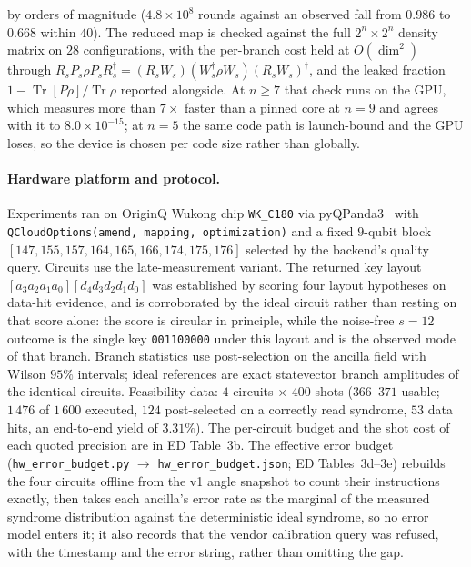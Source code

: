 \documentclass[aps,prxquantum,reprint,superscriptaddress]{revtex4-2}
\begin{document}
by orders of magnitude ($4.8\times10^{8}$ rounds against an observed fall from
$0.986$ to $0.668$ within $40$). The reduced map is checked against the full
$2^n\times2^n$ density matrix on $28$ configurations, with the per-branch cost
held at $O(\dim^2)$ through $R_sP_s\rho
P_sR_s^\dagger=(R_sW_s)(W_s^\dagger\rho W_s)(R_sW_s)^\dagger$, and the leaked
fraction $1-\operatorname{Tr}[P\rho]/\operatorname{Tr}\rho$ reported alongside.
At $n\ge7$ that check runs on the GPU, which measures more than $7\times$ faster
than a pinned core at $n=9$ and agrees with it to $8.0\times10^{-15}$; at $n=5$
the same code path is launch-bound and the GPU loses, so the device is chosen
per code size rather than globally.


\paragraph{Hardware platform and protocol.}
Experiments ran on OriginQ Wukong chip \texttt{WK\_C180} via
pyQPanda3~\cite{pyqpanda3,originq_cloud} with
\texttt{QCloudOptions(amend, mapping, optimization)} and a fixed
$9$-qubit block $[147,155,157,164,165,166,174,175,176]$ selected by the
backend's quality query. Circuits use the late-measurement variant. The
returned key layout $[a_3a_2a_1a_0][d_4d_3d_2d_1d_0]$ was established by
scoring four layout hypotheses on data-hit evidence, and is corroborated by the
ideal circuit rather than resting on that score alone: the score is circular in
principle, while the noise-free $s{=}12$ outcome is the single key
\texttt{001100000} under this layout and is the observed mode of that branch.
Branch statistics use
post-selection on the ancilla field with Wilson $95\%$ intervals; ideal
references are exact statevector branch amplitudes of the identical circuits.
Feasibility data: $4$ circuits $\times$ $400$ shots ($366$--$371$ usable;
$1\,476$ of $1\,600$ executed, $124$ post-selected on a correctly read
syndrome, $53$ data hits, an end-to-end yield of $3.31\%$). The per-circuit
budget and the shot cost of each quoted precision are in ED Table~3b. The
effective error budget (\texttt{hw\_error\_budget.py} $\to$
\texttt{hw\_error\_budget.json}; ED Tables~3d--3e) rebuilds the four circuits
offline from the v1 angle snapshot to count their instructions exactly, then
takes each ancilla's error rate as the marginal of the measured syndrome
distribution against the deterministic ideal syndrome, so no error model enters
it; it also records that the vendor calibration query was refused, with the
timestamp and the error string, rather than omitting the gap.
\end{document}
